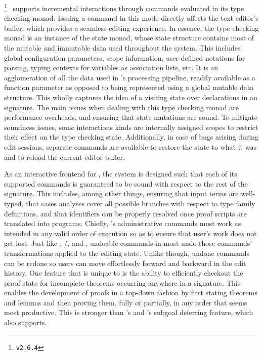 \Agda\footnote{\Agda \texttt{v2.6.4}}~\cite{clffolp, norell2007towards, agda2023} supports incremental interactions through commands evaluated in its type checking monad.
Issuing a command in this \Agda mode directly affects the text editor's buffer, which provides a seamless editing experience.
In essence, the type checking monad is an instance of the state monad, whose state structure contains most of the mutable and immutable data used throughout the system.
This includes global configuration parameters, scope information, user-defined notations for parsing, typing contexts for variables as association lists, etc.
It is an agglomeration of all the data used in \Agda's processing pipeline, readily available as a function parameter as opposed to being represented using a global mutable data structure.
This wholly captures the idea of a visiting state over declarations in an \Agda signature.
The main issues when dealing with this type checking monad are performance overheads, and ensuring that state mutations are sound.
To mitigate soundness issues, some interactions kinds are internally assigned scopes to restrict their effect on the type checking state.
Additionally, in case of bugs arising during edit sessions, separate commands are available to restore the state to what it was and to reload the current editor buffer.



As an interactive frontend for \Beluga, the \Harpoon system is designed such that each of its supported commands is guaranteed to be sound with respect to the rest of the signature.
This includes, among other things, ensuring that input terms are well-typed, that cases analyses cover all possible branches with respect to type family definitions, and that identifiers can be properly resolved once proof scripts are translated into programs.
Chiefly, \Harpoon's administrative commands must work as intended in any valid order of execution so as to ensure that user's work does not get lost.
Just like \Abella, \Isabelle/\Isar, \Coq and \Agda, undoable commands in \Harpoon must undo those commands' transformations applied to the editing state.
Unlike \Abella though, undone commands can be redone so users can move effortlessly forward and backward in the edit history.
One feature that is unique to \Harpoon is the ability to efficiently checkout the proof state for incomplete theorems occurring anywhere in a \Beluga signature.
This enables the development of proofs in a top-down fashion by first stating theorems and lemmas and then proving them, fully or partially, in any order that seems most productive.
This is stronger than \Abella's and \Coq's subgoal deferring feature, which \Harpoon also supports.

